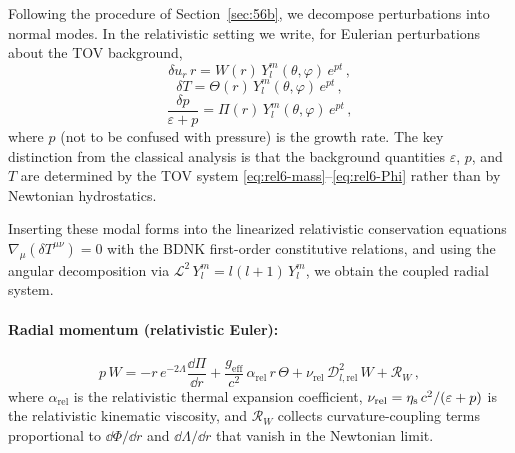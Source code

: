 Following the procedure of Section~\ref{sec:56b}, we decompose
perturbations into normal modes.  In the relativistic setting we write,
for Eulerian perturbations about the TOV background,
\begin{equation}
  \delta u_{r}\,r
  = W(r)\,Y_{l}^{m}(\theta,\varphi)\,e^{pt} \,,
  \label{eq:rel6-W}
\end{equation}
\begin{equation}
  \delta T
  = \Theta(r)\,Y_{l}^{m}(\theta,\varphi)\,e^{pt} \,,
  \label{eq:rel6-Theta}
\end{equation}
\begin{equation}
  \frac{\delta p}{\varepsilon + p}
  = \Pi(r)\,Y_{l}^{m}(\theta,\varphi)\,e^{pt} \,,
  \label{eq:rel6-Pi}
\end{equation}
where $p$ (not to be confused with pressure) is the growth rate.
The key distinction from the classical analysis is that the
background quantities $\varepsilon$, $p$, and $T$ are determined by the
TOV system \eqref{eq:rel6-mass}--\eqref{eq:rel6-Phi} rather than by
Newtonian hydrostatics.

Inserting these modal forms into the linearized relativistic
conservation equations $\nabla_{\mu}(\delta T^{\mu\nu}) = 0$ with
the BDNK first-order constitutive relations, and using the angular
decomposition via $\mathscr{L}^{2}\,Y_{l}^{m} = l(l+1)\,Y_{l}^{m}$,
we obtain the coupled radial system.

\paragraph{Radial momentum (relativistic Euler):}
\begin{equation}
  p\,W
  = -r\,e^{-2\Lambda}\frac{\dd\Pi}{\dd r}
    + \frac{g_{\mathrm{eff}}}{c^{2}}\,\alpha_{\mathrm{rel}}\,r\,\Theta
    + \nu_{\mathrm{rel}}\,\mathscr{D}_{l,\mathrm{rel}}^{2}\,W
    + \mathcal{R}_{W} \,,
  \label{eq:rel6-W-eq}
\end{equation}
where $\alpha_{\mathrm{rel}}$ is the relativistic thermal expansion
coefficient,
$\nu_{\mathrm{rel}} = \eta_{\mathrm{s}}\,c^{2}/(\varepsilon+p)$ is the
relativistic kinematic viscosity, and $\mathcal{R}_{W}$ collects
curvature-coupling terms proportional to $\dd\Phi/\dd r$ and
$\dd\Lambda/\dd r$ that vanish in the Newtonian limit.

